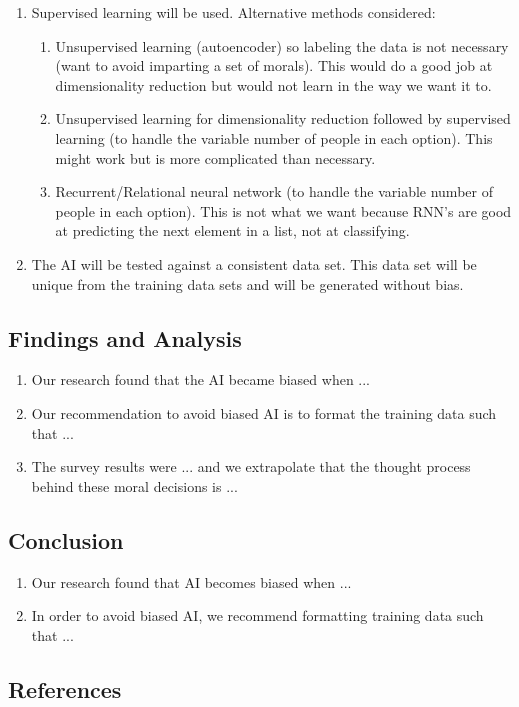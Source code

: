 \documentclass{article}
\begin{document}
\begin{enumerate}
    \item Supervised learning will be used. Alternative methods considered:
    \begin{enumerate}
        \item Unsupervised learning (autoencoder) so labeling the data is not necessary (want to avoid imparting a set of morals). This would do a good job at dimensionality reduction but would not learn in the way we want it to.
        \item Unsupervised learning for dimensionality reduction followed by supervised learning (to handle the variable number of people in each option). This might work but is more complicated than necessary.
        \item Recurrent/Relational neural network (to handle the variable number of people in each option). This is not what we want because RNN's are good at predicting the next element in a list, not at classifying.
    \end{enumerate}
    
    \item The AI will be tested against a consistent data set. This data set will be unique from the training data sets and will be generated without bias.
\end{enumerate}

\subsection{Findings and Analysis}

\begin{enumerate}
    \item Our research found that the AI became biased when ...
    \item Our recommendation to avoid biased AI is to format the training data such that ...
    \item The survey results were ... and we extrapolate that the thought process behind these moral decisions is ...
\end{enumerate}

\subsection{Conclusion}

\begin{enumerate}
    \item Our research found that AI becomes biased when ...
    \item In order to avoid biased AI, we recommend formatting training data such that ...
\end{enumerate}

\subsection{References}
\end{document}
